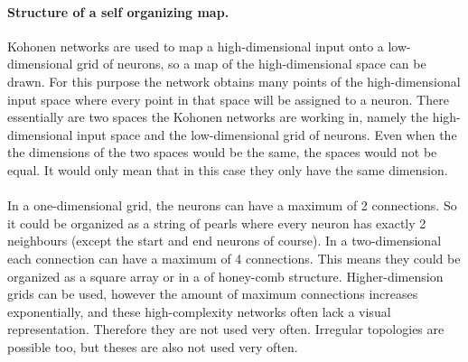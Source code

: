 \documentclass[pdftex,a4paper,12pt,twoside]{report}
\theoremstyle{plain} \newtheorem{theorem}{Theorem} \newtheorem{proposition}{Proposition} \newtheorem{lemma}{Lemma} \newtheorem*{corollary}{Corollary}
\theoremstyle{definition} \newtheorem{definition}{Definition} \newtheorem{conjecture}{Conjecture} \newtheorem*{example}{Example} \newtheorem{algorithm}{Algorithm}
\theoremstyle{remark} \newtheorem*{remark}{Remark} \newtheorem*{note}{Note} \newtheorem{case}{Case}
\begin{document}
\paragraph{Structure of a self organizing map.}
Kohonen networks are used to map a high-dimensional input onto a low-dimensional grid of neurons, so a map of the high-dimensional space can be drawn. For this purpose the network obtains many points of the high-dimensional input space where every point in that space will be assigned to a neuron. There essentially are two spaces the Kohonen networks are working in, namely the high-dimensional input space and the low-dimensional grid of neurons. Even when the the dimensions of the two spaces would be the same, the spaces would not be equal. It would only mean that in this case they only have the same dimension.\\\\
In a one-dimensional grid, the neurons can have a maximum of 2 connections. So it could be organized as a string of pearls where every neuron has exactly 2 neighbours (except the start and end neurons of course). In a two-dimensional each connection can have a maximum of 4 connections. This means they could be organized as a square array or in a of honey-comb structure. Higher-dimension grids can be used, however the amount of maximum connections increases exponentially, and these high-complexity networks often lack a visual representation. Therefore they are not used very often. Irregular topologies are possible too, but theses are also not used very often.
\end{document}
